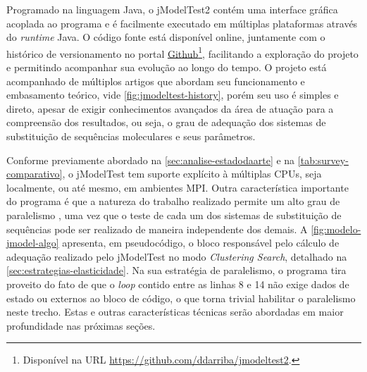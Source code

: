 \documentclass[english,brazilian]{UNISINOSmonografia} %
\begin{document}
{
	\renewcommand*{\thefootnote}{\fnsymbol{footnote}}
	\addtocounter{footnote}{0}
	\renewcommand*{\thefootnote}{\arabic{footnote}}
}


Programado na linguagem Java, o jModelTest2 contém uma interface gráfica acoplada ao programa e é facilmente executado em múltiplas plataformas através do \textit{runtime} Java.
O código fonte está disponível online, juntamente com o histórico de versionamento no portal \href{https://github.com/ddarriba/jmodeltest2}{Github}\footnote{
	Disponível na URL \url{https://github.com/ddarriba/jmodeltest2}.
}, facilitando a exploração do projeto e permitindo acompanhar sua evolução ao longo do tempo.
O projeto está acompanhado de múltiplos artigos que abordam seu funcionamento e embasamento teórico, vide \autoref{fig:jmodeltest-history},
porém seu uso é simples e direto, apesar de exigir conhecimentos avançados da área de atuação para a compreensão dos resultados, ou seja, o grau de adequação dos sistemas de substituição de sequências moleculares e seus parâmetros.



Conforme previamente abordado na \autoref{sec:analise-estadodaarte} e na \autoref{tab:survey-comparativo}, o jModelTest tem suporte explícito à múltiplas CPUs, seja localmente, ou até mesmo, em ambientes MPI.
Outra característica importante do programa é que a natureza do trabalho realizado permite um alto grau de paralelismo \cite{Keane2006a}, uma vez que o teste de cada um dos sistemas de substituição de sequências pode ser realizado de maneira independente dos demais.
%
A \autoref{fig:modelo-jmodel-algo} apresenta, em pseudocódigo, o bloco responsável pelo cálculo de adequação realizado pelo jModelTest no modo \textit{Clustering Search}, detalhado na \autoref{sec:estrategias-elasticidade}.
%
Na sua estratégia de paralelismo, o programa tira proveito do fato de que o \textit{loop} contido entre as linhas 8 e 14 não exige dados de estado ou externos ao bloco de código, o que torna trivial habilitar o paralelismo neste trecho.
%
Estas e outras características técnicas serão abordadas em maior profundidade nas próximas seções.
\end{document}
